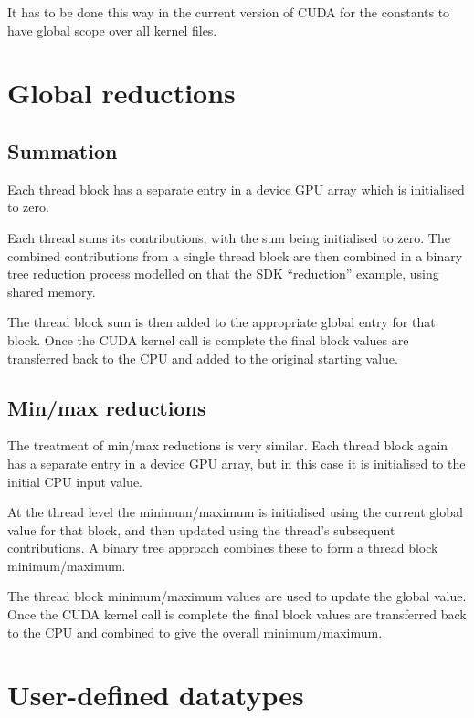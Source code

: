 \documentclass[12pt]{article}
\begin{document}
It has to be done this way in the current version of CUDA for the 
constants to have global scope over all kernel files.

\newpage

\section{Global reductions}

\subsection{Summation}

Each thread block has a separate entry in a device GPU array which is 
initialised to zero.

Each thread sums its contributions, with the sum being initialised to zero.
The combined contributions from a single thread block are then combined 
in a binary tree reduction process modelled on that the SDK ``reduction'' 
example, using shared memory.  

The thread block sum is then added to the appropriate global entry for that 
block.  Once the CUDA kernel call is complete the final block values are 
transferred back to the CPU and added to the original starting value.

\subsection{Min/max reductions}

The treatment of min/max reductions is very similar. Each thread block 
again has a separate entry in a device GPU array, but in this case 
it is initialised to the initial CPU input value.

At the thread level the minimum/maximum is initialised using the current 
global value for that block, and then updated using the thread's subsequent 
contributions.  A binary tree approach combines these to form a thread 
block minimum/maximum.

The thread block minimum/maximum values are used to update the global value.
Once the CUDA kernel call is complete the final block values are transferred 
back to the CPU and combined to give the overall minimum/maximum.


\section{User-defined datatypes}
\end{document}
